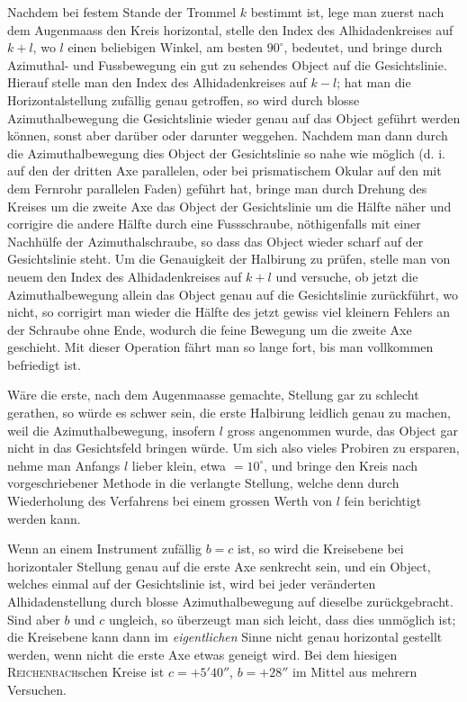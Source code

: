 \par\indent Nachdem bei festem Stande der Trommel $k$ bestimmt ist, lege man zuerst nach dem Augenmaass den Kreis horizontal, stelle den Index des Alhidadenkreises auf $k+l$, wo $l$ einen beliebigen Winkel, am besten $90^\circ$, bedeutet, und bringe durch Azimuthal- und Fussbewegung ein gut zu sehendes Object auf die Gesichtslinie. Hierauf stelle man den Index des Alhidadenkreises auf $k-l$; hat man die Horizontalstellung zufällig genau getroffen, so wird durch blosse Azimuthalbewegung die Gesichtslinie wieder genau auf das Object geführt werden können, sonst aber darüber oder darunter weggehen. Nachdem man dann durch die Azimuthalbewegung dies Object der Gesichtslinie so nahe wie möglich (d. i. auf den der dritten Axe parallelen, oder bei prismatischem Okular auf den mit dem Fernrohr parallelen Faden) geführt hat, bringe man durch Drehung des Kreises um die zweite Axe das Object der Gesichtslinie um die Hälfte näher und corrigire die andere Hälfte durch eine Fussschraube, nöthigenfalls mit einer Nachhülfe der Azimuthalschraube, so dass das Object wieder scharf auf der Gesichtslinie steht. Um die Genauigkeit der Halbirung zu prüfen, stelle man von neuem den Index des Alhidadenkreises auf $k+l$ und versuche, ob jetzt die Azimuthalbewegung allein das Object genau auf die Gesichtslinie zurückführt, wo nicht, so corrigirt man wieder die Hälfte des jetzt gewiss viel kleinern Fehlers an der Schraube ohne Ende, wodurch die feine Bewegung um die zweite Axe geschieht. Mit dieser Operation fährt man so lange fort, bis man vollkommen befriedigt ist.

\par\indent Wäre die erste, nach dem Augenmaasse gemachte, Stellung gar zu schlecht gerathen, so würde es schwer sein, die erste Halbirung leidlich genau zu machen, weil die Azimuthalbewegung, insofern $l$ gross angenommen wurde, das Object gar nicht in das Gesichtsfeld bringen würde. Um sich also vieles Probiren zu ersparen, nehme man Anfangs $l$ lieber klein, etwa $=10^\circ$, und bringe den Kreis nach vorgeschriebener Methode in die verlangte Stellung, welche denn durch Wiederholung des Verfahrens bei einem grossen Werth von $l$ fein berichtigt werden kann.

\par\indent Wenn an einem Instrument zufällig $b=c$ ist, so wird die Kreisebene bei horizontaler Stellung genau auf die erste Axe senkrecht sein, und ein Object, welches einmal auf der Gesichtslinie ist, wird bei jeder veränderten Alhidadenstellung durch blosse Azimuthalbewegung auf dieselbe zurückgebracht.  Sind aber $b$ und $c$ ungleich, so überzeugt man sich leicht, dass dies unmöglich ist; die Kreisebene kann dann im \emph{eigentlichen} Sinne nicht genau horizontal gestellt werden, wenn nicht die erste Axe etwas geneigt wird. Bei dem hiesigen \textsc{Reichenbach}schen Kreise ist $c=+5'40''$, $b=+28''$ im Mittel aus mehrern Versuchen.

